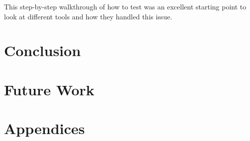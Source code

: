 \documentclass[11pt]{article}
\begin{document}
This step-by-step walkthrough of how to test was an excellent starting point to look at different tools and how they handled this issue.

\section{Conclusion}


\section{Future Work}


\section{Appendices}

\newpage





\nocite{*}
\end{document}
